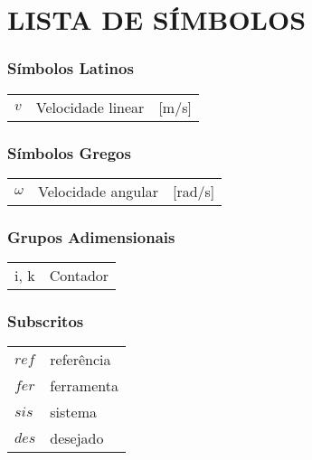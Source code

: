 




\chapter*{LISTA DE SÍMBOLOS}




\subsection*{Símbolos Latinos}

\begin{tabular}{p{}p{}>{\PreserveBacklash\raggedleft}p{}}
$v$  & Velocidade linear  & {[}m/s{]}\tabularnewline
\end{tabular}


\subsection*{Símbolos Gregos}

\begin{tabular}{p{}p{}>{\PreserveBacklash\raggedleft}p{}}
$\omega$ & Velocidade angular & {[}rad/s{]}\tabularnewline
\end{tabular}


\subsection*{Grupos Adimensionais}

\begin{tabular}{p{}p{}}
i, k & Contador\tabularnewline
\end{tabular}


\subsection*{Subscritos}

\begin{tabular}{p{}p{}}
$ref$  & referência \tabularnewline
$fer$  & ferramenta \tabularnewline
$sis$  & sistema \tabularnewline
$des$  & desejado\tabularnewline
\end{tabular}


